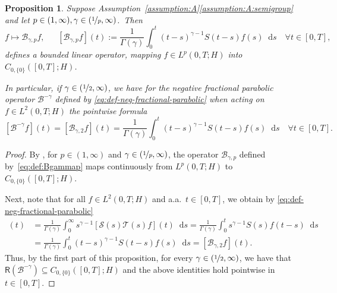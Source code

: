 \documentclass[reqno]{amsart}
\numberwithin{equation}{section}
\newcommand{\cB}{\mathcal{B}}
\newcommand{\cS}{\mathcal{S}}
\newcommand{\cT}{\mathcal{T}}
\newcommand{\rd}{\mathop{}\!\mathrm{d}}
\newtheorem{proposition}[lemma]{Proposition}
\theoremstyle{remark}
\theoremstyle{definition}
\begin{document}
\begin{proposition}\label{prop:neg-frac-C00}
	Suppose Assumption~\textup{\ref{assumption:A}\ref{assumption:A:semigroup}} 
	and let $p\in(1,\infty), \gamma\in(\nicefrac{1}{p},\infty)$.~Then 
	\begin{equation}\label{eq:def:Bgammap} 
	f \mapsto \mathscr{B}_{\gamma,p} f, 
	\quad\;\;  
	[\mathscr{B}_{\gamma,p} f](t) 
	:= 
	\frac{1}{\Gamma(\gamma)} 
	\int_0^t (t-s)^{\gamma-1} S(t-s)f(s) \rd s 
	\quad 
	\forall t \in [0,T], 
	\end{equation} 
	defines a bounded linear operator, 
	mapping $f\in L^p(0,T;H)$ 
	into $C_{0,\{0\}}([0,T];H)$. 
	
	In particular, if $\gamma\in(\nicefrac{1}{2}, \infty)$, 
	we have for 
	the negative fractional parabolic operator 
	${\cB^{-\gamma}}$ defined 
	by \eqref{eq:def-neg-fractional-parabolic}  
	when acting on $f\in L^2(0,T;H)$ 
	the pointwise formula
	\begin{equation}\label{eq:neg-parabolic-formula} 
	[\cB^{-\gamma} f](t)
	= 
	[\mathscr{B}_{\gamma,2} f](t) 
	= 
	\frac{1}{\Gamma(\gamma)} 
	\int_0^t (t-s)^{\gamma-1} S(t-s)f(s) \rd s 
	\quad 
	\forall t \in [0,T]. 
	\end{equation}
\end{proposition}


\begin{proof} 
	By \cite[Proposition~5.9]{DaPrato2014}, 
	for $p\in(1,\infty)$ and $\gamma\in(\nicefrac{1}{p},\infty)$,  
	the operator $\mathscr{B}_{\gamma,p}$ 
	defined by~\eqref{eq:def:Bgammap} 
	maps continuously from $L^p(0,T;H)$ 
	to $C_{0,\{0\}}([0,T];H)$. 
	
	Next, note that for all $f \in L^2(0,T;H)$ 
	and a.a.\ $t \in [0,T]$, we obtain 
	by \eqref{eq:def-neg-fractional-parabolic}  
	\begin{align*}
	[\cB^{-\gamma}f ](t) 
	&= 
	\frac{1}{\Gamma(\gamma)} 
	\int_0^\infty s^{\gamma-1} [ \cS(s) \cT(s) f ](t)\rd s
	= 
	\frac{1}{\Gamma(\gamma)} \int_0^t s^{\gamma-1} S(s) f(t-s) \rd s 
	\\
	&= 
	\frac{1}{\Gamma(\gamma)} \int_0^t (t-s)^{\gamma-1} S(t-s) f(s) \rd s 
	= 
	[\mathscr{B}_{\gamma,2} f](t).
	\end{align*}
	Thus, by the first part of this proposition, 
	for every $\gamma\in(\nicefrac{1}{2},\infty)$, 
	we have that $\mathsf R(\cB^{-\gamma})\subseteq C_{0,\{0\}}([0,T];H)$ 
	and the above identities hold pointwise in $t\in[0,T]$. 
\end{proof}
\end{document}
